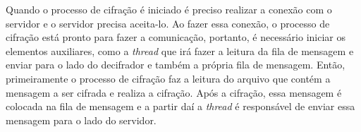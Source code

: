 Quando o processo de cifração é iniciado é preciso realizar a conexão com o servidor e o servidor precisa aceita-lo. Ao fazer essa conexão, o processo de cifração está pronto para fazer a comunicação, portanto, é necessário iniciar os elementos auxiliares, como a \textit{thread} que irá fazer a leitura da fila de mensagem e enviar para o lado do decifrador e também a própria fila de mensagem. Então, primeiramente o processo de cifração faz a leitura do arquivo que contém a mensagem a ser cifrada e realiza a cifração. Após a cifração, essa mensagem é colocada na fila de mensagem e a partir daí a \textit{thread} é responsável de enviar essa mensagem para o lado do servidor.